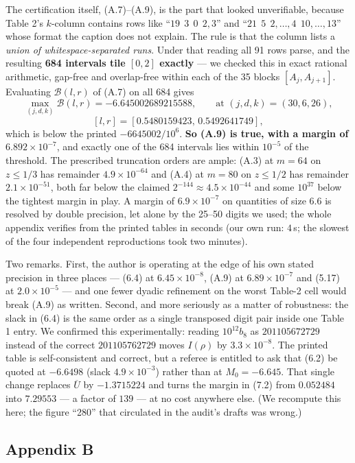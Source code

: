 \documentclass[11pt]{article}
\theoremstyle{definition}
\newcommand{\Ub}{\overline{U}}
\begin{document}
The certification itself, (A.7)--(A.9), is the part that looked unverifiable, because Table 2's
$k$-column contains rows like ``$19\ \ 3\ \ 0\ \ 2,3$'' and ``$21\ \ 5\ \ 2,\dots,4\ \ 10,\dots,13$''
whose format the caption does not explain. The rule is that the column lists a \emph{union of
whitespace-separated runs}. Under that reading all 91 rows parse, and the resulting
\textbf{684 intervals tile $[0,2]$ exactly} --- we checked this in exact rational arithmetic,
gap-free and overlap-free within each of the 35 blocks $[A_j,A_{j+1}]$. Evaluating $\mathcal{B}(l,r)$
of (A.7) on all 684 gives
\[
\max_{(j,d,k)}\mathcal{B}(l,r)=-6.645002689215588,\qquad
\text{at }(j,d,k)=(30,6,26),
\]
\[
[l,r]=[0.5480159423,\,0.5492641749],
\]
which is below the printed $-6645002/10^6$. \textbf{So (A.9) is true, with a margin of
$6.892\times10^{-7}$}, and exactly one of the 684 intervals lies within $10^{-5}$ of the
threshold. The prescribed truncation orders are ample: (A.3) at $m=64$ on $z\le1/3$ has
remainder $4.9\times10^{-64}$ and (A.4) at $m=80$ on $z\le1/2$ has remainder $2.1\times10^{-51}$,
both far below the claimed $2^{-144}\approx4.5\times10^{-44}$ and some $10^{37}$ below the
tightest margin in play. A margin of $6.9\times10^{-7}$ on quantities of size $6.6$ is resolved
by double precision, let alone by the 25--50 digits we used; the whole appendix verifies from
the printed tables in seconds (our own run: $4$\,s; the slowest of the four independent
reproductions took two minutes).

Two remarks. First, the author is operating at the edge of his own stated precision in
three places --- (6.4) at $6.45\times10^{-8}$, (A.9) at $6.89\times10^{-7}$ and (5.17) at
$2.0\times10^{-5}$ --- and one fewer dyadic refinement on the worst Table-2 cell would break
(A.9) as written. Second, and more seriously as a matter of robustness: the slack in (6.4) is
the same order as a single transposed digit pair inside one Table 1 entry. We confirmed this
experimentally: reading $10^{12}b_8$ as $201105672729$ instead of the correct $201105762729$
moves $I(\rho)$ by $3.3\times10^{-8}$. The printed table is self-consistent and correct, but a
referee is entitled to ask that (6.2) be quoted at $-6.6498$ (slack $4.9\times10^{-3}$) rather
than at $M_0=-6.645$. That single change replaces $\Ub$ by $-1.3715224$ and turns the margin in
(7.2) from $0.052484$ into $7.29553$ --- a factor of $139$ --- at no cost anywhere else. (We
recompute this here; the figure ``280'' that circulated in the audit's drafts was wrong.)

\subsection{Appendix B}
\end{document}
